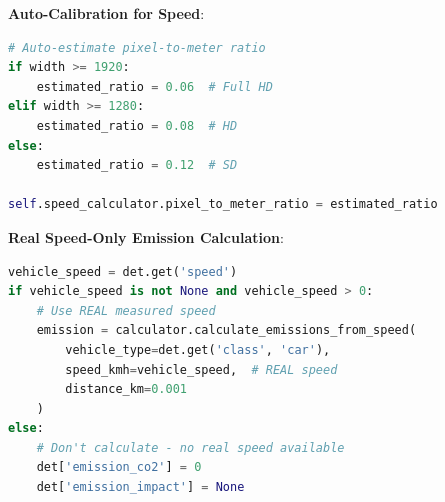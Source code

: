 \documentclass[12pt,a4paper]{article}
\begin{document}
\textbf{Auto-Calibration for Speed}:
\begin{lstlisting}[language=Python]
# Auto-estimate pixel-to-meter ratio
if width >= 1920:
    estimated_ratio = 0.06  # Full HD
elif width >= 1280:
    estimated_ratio = 0.08  # HD
else:
    estimated_ratio = 0.12  # SD

self.speed_calculator.pixel_to_meter_ratio = estimated_ratio
\end{lstlisting}

\textbf{Real Speed-Only Emission Calculation}:
\begin{lstlisting}[language=Python]
vehicle_speed = det.get('speed')
if vehicle_speed is not None and vehicle_speed > 0:
    # Use REAL measured speed
    emission = calculator.calculate_emissions_from_speed(
        vehicle_type=det.get('class', 'car'),
        speed_kmh=vehicle_speed,  # REAL speed
        distance_km=0.001
    )
else:
    # Don't calculate - no real speed available
    det['emission_co2'] = 0
    det['emission_impact'] = None
\end{lstlisting}
\end{document}
